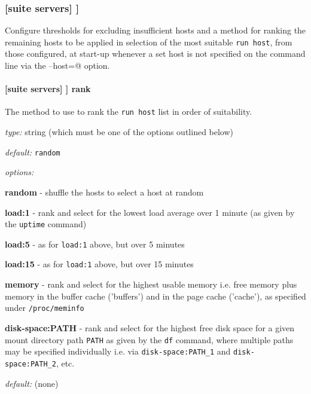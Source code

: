 \subsubsection[run host select]{[suite servers] \textrightarrow [[run host select]]}

Configure thresholds for excluding insufficient hosts and a method for
ranking the remaining hosts to be applied in selection of the most suitable
\lstinline=run host=, from those configured, at start-up whenever a set host
is not specified on the command line via the \lstinline@--host=@ option.

\paragraph[rank]{[suite servers] \textrightarrow [[run host select]] \textrightarrow rank}

The method to use to rank the \lstinline=run host= list in order of
suitability.

\begin{myitemize}
\item {\em type:} string (which must be one of the options outlined below)
\item {\em default:} \lstinline=random=
\item {\em options:}
    \begin{myitemize}
    \item {\bf random} - shuffle the hosts to select a host at random
    \item {\bf load:1} - rank and select for the lowest load average over 1 minute (as given by the \lstinline=uptime= command)
    \item {\bf load:5} - as for \lstinline=load:1= above, but over 5 minutes
    \item {\bf load:15} - as for \lstinline=load:1= above, but over 15 minutes
    \item {\bf memory} - rank and select for the highest usable memory i.e.
      free memory plus memory in the buffer cache ('buffers') and in the
      page cache ('cache'), as specified under \lstinline=/proc/meminfo=
    \item {\bf disk-space:PATH} - rank and select for the highest free disk
      space for a given mount directory path \lstinline=PATH= as given by
      the \lstinline=df= command, where multiple paths may be specified
      individually i.e. via \lstinline=disk-space:PATH_1= and
      \lstinline=disk-space:PATH_2=, etc.
    \end{myitemize}
\item {\em default:} (none)
\end{myitemize}

